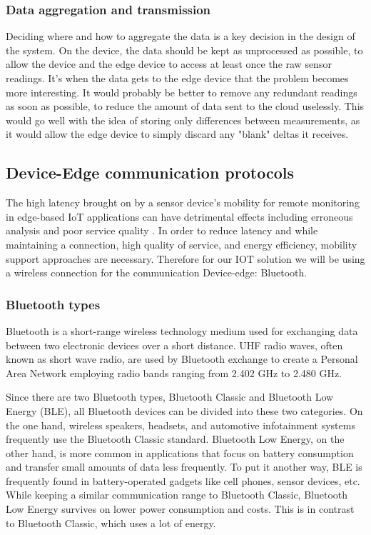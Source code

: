 \subsubsection*{Data aggregation and transmission}
Deciding where and how to aggregate the data is a key decision in the design of the
system. On the device, the data should be kept as unprocessed as possible, to allow the device
and the edge device to access at least once the raw sensor readings. It's when the data
gets to the edge device that the problem becomes more interesting. It would probably
be better to remove any redundant readings as soon as possible, to reduce the amount of
data sent to the cloud uselessly. This would go well with the idea of storing only
differences between measurements, as it would allow the edge device to simply discard
any "blank" deltas it receives.

\subsection{Device-Edge communication protocols}
The high latency brought on by a sensor device's mobility for remote monitoring in edge-based IoT applications can have detrimental effects including erroneous analysis and poor service quality \cite{b5}. In order to reduce latency and while maintaining a connection, high quality of service, and energy efficiency, mobility support approaches are necessary. Therefore for our IOT solution we will be using a wireless connection for the communication Device-edge: Bluetooth. 
\subsubsection{Bluetooth types}
Bluetooth is a short-range wireless technology medium used for exchanging data between two electronic devices over a short distance. 
UHF radio waves, often known as short wave radio, are used by Bluetooth exchange to create a Personal Area Network employing radio bands ranging from 2.402 GHz to 2.480 GHz.

Since there are two Bluetooth types, Bluetooth Classic and Bluetooth Low Energy (BLE), all Bluetooth devices can be divided into these two categories. On the one hand, wireless speakers, headsets, and automotive infotainment systems frequently use the Bluetooth Classic standard. Bluetooth Low Energy, on the other hand, is more common in applications that focus on battery consumption and transfer small amounts of data less frequently. To put it another way, BLE is frequently found in battery-operated gadgets like cell phones, sensor devices, etc. While keeping a similar communication range to Bluetooth Classic, Bluetooth Low Energy survives on lower power consumption and costs. This is in contrast to Bluetooth Classic, which uses a lot of energy.

